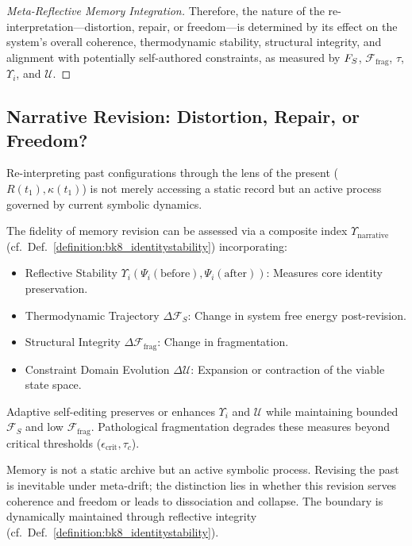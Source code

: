 \begin{proof}[Meta-Reflective Memory Integration]
Therefore, the nature of the re-interpretation—distortion, repair, or freedom—is determined by its effect on the system's overall coherence, thermodynamic stability, structural integrity, and alignment with potentially self-authored constraints, as measured by $F_S$, $\mathcal{F}_{\text{frag}}$, $\tau$, $\Upsilon_i$, and $\mathcal{U}$.
\end{proof}
\subsection{Narrative Revision: Distortion, Repair, or Freedom?}
\label{subsec:bk9_narrative_revision}
Re-interpreting past configurations through the lens of the present ($R(t_1), \kappa(t_1)$) is not merely accessing a static record but an active process governed by current symbolic dynamics.
\begin{definition}
\label{definition:bk9_index_of_narrative_fidelity}
The fidelity of memory revision can be assessed via a composite index $\Upsilon_{\text{narrative}}$ (cf.~Def.~\ref{definition:bk8_identitystability}) incorporating:
\begin{itemize}
    \item Reflective Stability $\Upsilon_i(\Psi_i(\text{before}), \Psi_i(\text{after}))$: Measures core identity preservation.
    \item Thermodynamic Trajectory $\Delta \mathcal{F}_S$: Change in system free energy post-revision.
    \item Structural Integrity $\Delta \mathcal{F}_{\text{frag}}$: Change in fragmentation.
    \item Constraint Domain Evolution $\Delta \mathcal{U}$: Expansion or contraction of the viable state space.
\end{itemize}
Adaptive self-editing preserves or enhances $\Upsilon_i$ and $\mathcal{U}$ while maintaining bounded $\mathcal{F}_S$ and low $\mathcal{F}_{\text{frag}}$. Pathological fragmentation degrades these measures beyond critical thresholds ($\epsilon_{\text{crit}}, \tau_c$).
\end{definition}
\begin{scholium}
Memory is not a static archive but an active symbolic process. Revising the past is inevitable under meta-drift; the distinction lies in whether this revision serves coherence and freedom or leads to dissociation and collapse. The boundary
\label{proposition:bk9_entropy_reflection_boundary} is dynamically maintained through reflective integrity (cf.~Def.~\ref{definition:bk8_identitystability}).
\end{scholium}
